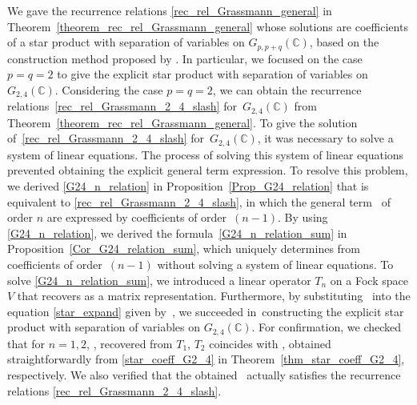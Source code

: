 \documentclass[pdftex]{sigma}
\numberwithin{equation}{section}
\begin{document}
We gave the recurrence relations \eqref{rec_rel_Grassmann_general} in Theorem~\ref{theorem_rec_rel_Grassmann_general} whose solutions are coefficients of a star product with separation of variables on $G_{p,p+q}(\mathbb{C})$, based on the construction method proposed by \cite{HS1,HS2}. In particular, we focused on the case $p=q=2$ to give the explicit star product with separation of variables on $G_{2,4}(\mathbb{C})$. Considering the case $p=q=2$, we can obtain the recurrence relations~\eqref{rec_rel_Grassmann_2_4_slash} for~${G_{2,4}(\mathbb{C})}$ from Theorem~\ref{theorem_rec_rel_Grassmann_general}. To give the solution of~\eqref{rec_rel_Grassmann_2_4_slash} for~$G_{2,4}(\mathbb{C})$, it was necessary to solve a system of linear equations. The process of solving this system of linear equations prevented obtaining the explicit general term expression. To resolve this problem, we derived \eqref{G24_n_relation} in Proposition~\ref{Prop_G24_relation} that is equivalent to \eqref{rec_rel_Grassmann_2_4_slash}, in which the general term~ of order $n$ are expressed by coefficients of order~${(n-1)}$.
By using \eqref{G24_n_relation}, we derived the formula~\eqref{G24_n_relation_sum} in Proposition~\ref{Cor_G24_relation_sum}, which uniquely determines  from coefficients of order~${(n-1)}$ without solving a system of linear equations.
To solve
\eqref{G24_n_relation_sum}, we introduced a linear operator $T_{n}$ on a Fock space $V$ that recovers 
as a matrix representation. Furthermore, by substituting~ into the equation \eqref{star_expand} given by~\cite{HS1,HS2}, we succeeded in~constructing the explicit star product with separation of variables on $G_{2,4}(\mathbb{C})$. For confirmation, we checked that for $n=1,2$,
,
recovered from
$
T_{1}$,
$
T_{2}
$
coincides with
,
obtained straightforwardly from \eqref{star_coeff_G2_4} in Theorem~\ref{thm_star_coeff_G2_4}, respectively. We also verified that the obtained~ actually satisfies the recurrence relations \eqref{rec_rel_Grassmann_2_4_slash}.
\end{document}
